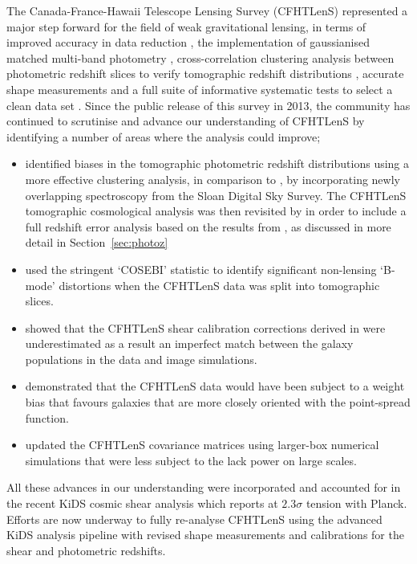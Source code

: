 The Canada-France-Hawaii Telescope Lensing Survey (CFHTLenS) represented a major step forward for the field of weak gravitational lensing, in terms of improved accuracy in data reduction \citep{erben/etal:2013}, the implementation of gaussianised matched multi-band photometry \citep{hildebrandt/etal:2012}, cross-correlation clustering analysis between photometric redshift slices to verify tomographic redshift distributions \citep{benjamin/etal:2013}, accurate shape measurements \citep{miller/etal:2013} and a full suite of informative systematic tests to select a clean data set \citep{heymans/etal:2012}.    Since the public release of this survey in 2013, the community has continued to scrutinise and advance our understanding of CFHTLenS by identifying a number of areas where the analysis could improve;
\begin{itemize}
\item{\citet{choi/etal:2016} identified biases in the tomographic photometric redshift distributions using a more effective clustering analysis, in comparison to \citet{benjamin/etal:2013}, by incorporating newly overlapping spectroscopy from the Sloan Digital Sky Survey.  The CFHTLenS tomographic cosmological analysis was then revisited by \citet{joudaki/etal:2016} in order to include a full redshift error analysis based on the results from \citet{choi/etal:2016}, as discussed in more detail in Section~\ref{sec:photoz}}
\item{\citet{asgari/etal:2016} used the stringent `COSEBI' statistic to identify significant non-lensing `B-mode' distortions when the CFHTLenS data was split into tomographic slices.}
\item{\citet{kuijken/etal:2015} showed that the CFHTLenS shear calibration corrections derived in \citet{miller/etal:2013} were underestimated as a result an imperfect match between the galaxy populations in the data and image simulations.}
\item{\citet{fenechconti/etal:2016} demonstrated that the CFHTLenS data would have been subject to a weight bias that favours galaxies that are more closely oriented with the point-spread function.}
\item{\citet{joudaki/etal:2016} updated the CFHTLenS covariance matrices using larger-box numerical simulations that were less subject to the lack power on large scales.}
\end{itemize}
All these advances in our understanding were incorporated and accounted for in the recent KiDS cosmic shear analysis \citep{hildebrandt/etal:2016} which reports at $2.3 \sigma$ tension with Planck.  Efforts are now underway to fully re-analyse CFHTLenS using the advanced KiDS analysis pipeline with revised shape measurements and calibrations for the shear and photometric redshifts.  

